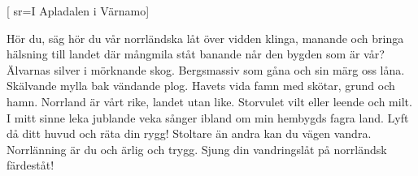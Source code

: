 
[
  sr={I Apladalen i Värnamo}]
  
\beginverse*
 Hör du, säg hör du vår norrländska låt
 över vidden klinga, manande och bringa
 hälsning till landet där mångmila ståt
 banande når den bygden som är vår?
 \endverse
 \beginverse*
 Älvarnas silver i mörknande skog.
 Bergsmassiv som gåna och sin märg oss låna.
 Skälvande mylla bak vändande plog.
 Havets vida famn med skötar, grund och hamn.
 \endverse
 \beginverse*
 Norrland är vårt rike, landet utan like.
 Storvulet vilt eller leende och milt.
 I mitt sinne leka jublande veka
 sånger ibland om min hembygds fagra land.
 \endverse
 \beginverse*
 Lyft då ditt huvud och räta din rygg!
 Stoltare än andra kan du vägen vandra.
 Norrlänning är du och ärlig och trygg.
 Sjung din vandringslåt på norrländsk färdeståt!
\endverse
\endsong



